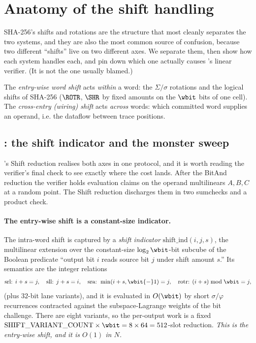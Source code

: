 \section{Anatomy of the shift handling}
\label{sec:shifts}

SHA-256's shifts and rotations are the structure that most cleanly
separates the two systems, and they are also the most common source of
confusion, because two different ``shifts'' live on two different axes.
We separate them, then show how each system handles each, and pin down
which one actually causes \binius{}'s linear verifier. (It is not the one
usually blamed.)

\begin{definition}
\label{def:two-shifts}
The \emph{entry-wise word shift} acts \emph{within} a word: the
$\Sigma/\sigma$ rotations and the logical shifts of SHA-256
($\ROTR$, $\SHR$ by fixed amounts on the $\wbit$ bits of one cell). The
\emph{cross-entry (wiring) shift} acts \emph{across} words: which
committed word supplies an operand, i.e. the dataflow between trace
positions.
\end{definition}

\subsection{\binius{}: the shift indicator and the monster sweep}
\label{sec:shifts-binius}

\binius{}'s Shift reduction realises both axes in one protocol, and it is
worth reading the verifier's final check to see exactly where the cost
lands. After the BitAnd reduction the verifier holds evaluation claims on
the operand multilinears $A,B,C$ at a random point. The Shift reduction
discharges them in two sumchecks and a product check.

\paragraph{The entry-wise shift is a constant-size indicator.}
The intra-word shift is captured by a \emph{shift indicator}
$\mathrm{shift\_ind}(i,j,s)$, the multilinear extension over the
constant-size $\log_2\wbit$-bit subcube of the Boolean predicate ``output
bit $i$ reads source bit $j$ under shift amount $s$.'' Its semantics are
the integer relations
\[
  \text{srl: } i+s=j, \quad
  \text{sll: } j+s=i, \quad
  \text{sra: } \min(i+s,\wbit{-}1)=j, \quad
  \text{rotr: } (i+s)\bmod\wbit = j,
\]
(plus $32$-bit lane variants), and it is evaluated in $O(\wbit)$ by short
$\sigma/\varphi$ recurrences contracted against the subspace-Lagrange
weights of the bit challenge. There are eight variants, so the per-output
work is a fixed $\mathrm{SHIFT\_VARIANT\_COUNT}\times\wbit = 8\times 64 =
512$-slot reduction. \emph{This is the entry-wise shift, and it is
$O(1)$ in $N$.}

